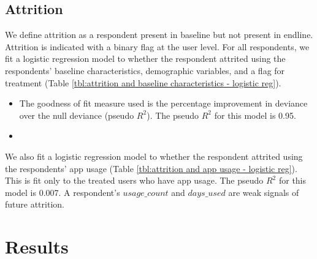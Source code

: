\documentclass{article}
\begin{document}


\subsection*{Attrition}
We define attrition as a respondent present in baseline but
not present in endline. Attrition is indicated with a binary flag at the user level. For all respondents, we fit a logistic regression model to whether the respondent attrited using the respondents' baseline characteristics, demographic variables, and a flag for treatment (Table \ref{tbl:attrition and baseline characteristics - logistic reg}).

\begin{itemize}
    \item The goodness of fit measure used is the percentage improvement in deviance over the null deviance (pseudo $R^{2}$). The pseudo $R^{2}$ for this model is 0.95.
    \item
\end{itemize}


We also fit a logistic regression model to whether the respondent attrited using the respondents' app usage (Table \ref{tbl:attrition and app usage - logistic reg}). This is fit only to the treated users who have app usage. The pseudo $R^{2}$ for this model is 0.007. A respondent's $usage\_count$ and $days\_used$ are weak signals of future attrition.





\section{Results}
\end{document}
